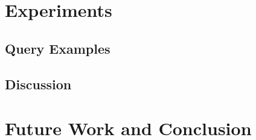 \documentclass{acm_proc_article-sp}
\begin{document}
\section{Experiments}

\subsection{Query Examples}

\subsection{Discussion}

\section{Future Work and Conclusion}






\balancecolumns
\end{document}
